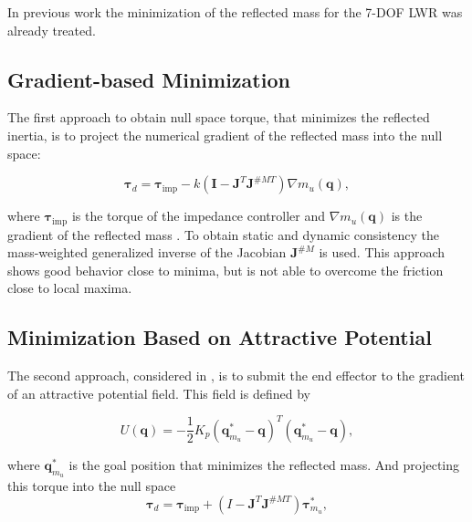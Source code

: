In previous work \cite{paper_iros2017} the minimization of the reflected mass for the 7-DOF LWR was already treated.  
\subsection{Gradient-based  Minimization}
\label{subsec:gbm_7DOF}

The first approach to obtain null space torque, that minimizes the reflected inertia, is to project the numerical gradient of the reflected mass into the null space:
 
\begin{equation}
\mathbf{\tau}_d = \mathbf{\tau}_\mathrm{imp} - k (\mathbf{I} - \mathbf{J}^T \mathbf{J}^{\#MT}) \nabla m_u(\mathbf{q}), \label{eq:gbm_nico}
\end{equation}

where $\mathbf{\tau}_\mathrm{imp}$ is the torque of the impedance controller and $\nabla m_u(\mathbf{q})$ is the gradient of the reflected mass \cite{paper_iros2017}. To obtain static and dynamic consistency \cite{khatib1995} the mass-weighted generalized inverse of the Jacobian $\mathbf{J}^{\#M}$ is used.
This approach shows good behavior close to minima, but is not able to overcome the friction close to local maxima. 




\subsection{Minimization Based on Attractive Potential}
\label{subsec:minim_potential_intro}


The second approach, considered in \cite{paper_iros2017}, is to submit the end effector to the gradient of an attractive potential field. This field is defined by 


\begin{equation}
U(\mathbf{q}) = - \frac{1}{2} K_p (\mathbf{q}_{m_u}^\ast - \mathbf{q})^T (\mathbf{q}_{m_u}^\ast - \mathbf{q}), \label{eq:potential_intro}
\end{equation}

where $\mathbf{q}_{m_u}^\ast$ is the goal position that minimizes the reflected mass. And projecting this torque into the null space
\begin{equation}
\mathbf{\tau}_d = \mathbf{\tau}_\mathrm{imp} + (I - \mathbf{J}^T \mathbf{J}^{\#MT}) \mathbf{\tau}_{m_u}^\ast, \label{eq:potential_controller_intro}
\end{equation}


